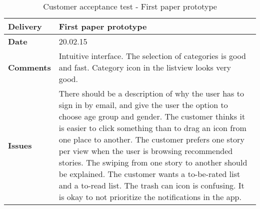 \renewcommand{\arraystretch}{2}%
\begin{center}
	\begin{longtable}{ | p{4cm} | p{13cm} | }
		
		\caption[Customer acceptance test - First paper prototype]{Customer acceptance test - First paper prototype} \label{Tab:cattest1}\\
		\hline
		\textbf{Delivery} & First paper prototype\\ \hline
		\textbf{Date} & 20.02.15 \\ \hline 
		\textbf{Comments} &Intuitive interface. The selection of categories is good and fast. Category icon in the listview looks very good.
		\\ \hline
		\textbf{Issues} &
		There should be a description of why the user has to sign in by email, and give the user the option to choose age group and gender. The customer thinks it is easier to click something than to drag an icon from one place to another.  The customer prefers one story per view when the user is browsing recommended stories. The swiping from one story to another should be explained. The customer wants a to-be-rated list and a to-read list. The trash can icon is confusing. It is okay to not prioritize the notifications in the app. 	
		\\ \hline
		
	\end{longtable}
\end{center}

